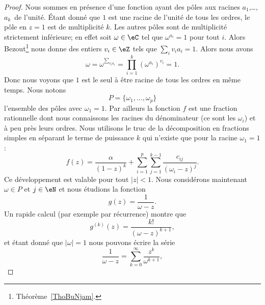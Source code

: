 \begin{proof}
    Nous sommes en présence d'une fonction ayant des pôles aux racines \( a_1\),\ldots, \( a_k\)\ieme\ de l'unité. Étant donné que \( 1\) est une racine de l'unité de tous les ordres, le pôle en \( z=1\) est de multiplicité \( k\). Les autres pôles sont de multiplicité strictement inférieure; en effet soit \( \omega\in \eC\) tel que \( \omega^{a_i}=1\) pour tout \( i\). Alors Bezout\footnote{Théorème~\ref{ThoBuNjam}.} nous donne des entiers \( v_i\in \eZ\) tels que \( \sum_iv_ia_i=1\). Alors nous avons
    \begin{equation}
        \omega=\omega^{\sum_{v_ia_i}}=\prod_{i=1}^k(\omega^{a_i})^{v_i}=1.
    \end{equation}
    Donc nous voyons que \( 1\) est le seul à être racine de tous les ordres en même temps. Nous notons
    \begin{equation}
        P=\{ \omega_1,\ldots, \omega_p \}
    \end{equation}
    l'ensemble des pôles avec \( \omega_1=1\). Par ailleurs la fonction \( f\) est une fraction rationnelle dont nous connaissons les racines du dénominateur (ce sont les \( \omega_i\)) et à peu près leurs ordres. Nous utilisons le truc de la décomposition en fractions simples
    en séparant le terme de puissance \( k\) qui n'existe que pour la racine \( \omega_1=1\) :
    \begin{equation}    \label{EqDLTJaYr}
        f(z)=\frac{ \alpha }{ (1-z)^k }+\sum_{i=1}^p\sum_{j=1}^{k-1}\frac{ c_{ij} }{ (\omega_i-z)^j }.
    \end{equation}
    Ce développement est valable pour tout \( | z |<1\). Nous considérons maintenant \( \omega\in P\) et \( j\in \eN\) et nous étudions la fonction
    \begin{equation}
        g(z)=\frac{1}{ \omega-z }.
    \end{equation}
    Un rapide calcul (par exemple par récurrence) montre que
    \begin{equation}    \label{EqEJLDIFJ}
        g^{(k)}(z)=\frac{ k! }{ (\omega-z)^{k+1} },
    \end{equation}
    et étant donné que \( | \omega |=1\) nous pouvons écrire la série
    \begin{equation}
        \frac{1}{ \omega-z }=\sum_{k=0}^{\infty}\frac{ z^k }{ \omega^{k+1} },

\end{equation}
\end{proof}
